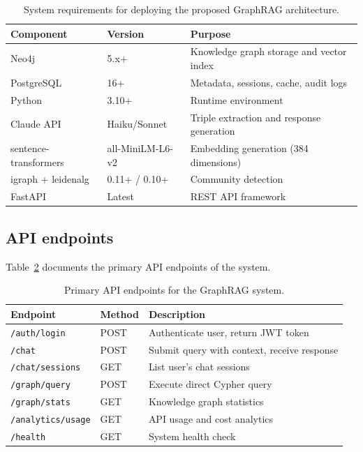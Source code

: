 \documentclass[review]{elsarticle}
\begin{document}
\begin{table}[ht]
\caption{System requirements for deploying the proposed GraphRAG architecture.}
\label{tab:requirements}
\centering
\small
\begin{tabular}{@{}llp{5cm}@{}}
\toprule
\textbf{Component} & \textbf{Version} & \textbf{Purpose} \\
\midrule
Neo4j & 5.x+ & Knowledge graph storage and vector index \\
PostgreSQL & 16+ & Metadata, sessions, cache, audit logs \\
Python & 3.10+ & Runtime environment \\
Claude API & Haiku/Sonnet & Triple extraction and response generation \\
sentence-transformers & all-MiniLM-L6-v2 & Embedding generation (384 dimensions) \\
igraph + leidenalg & 0.11+ / 0.10+ & Community detection \\
FastAPI & Latest & REST API framework \\
\bottomrule
\end{tabular}
\end{table}

\subsection{API endpoints}

Table~\ref{tab:api-endpoints} documents the primary API endpoints of the system.

\begin{table}[ht]
\caption{Primary API endpoints for the GraphRAG system.}
\label{tab:api-endpoints}
\centering
\small
\begin{tabular}{@{}llp{5cm}@{}}
\toprule
\textbf{Endpoint} & \textbf{Method} & \textbf{Description} \\
\midrule
\texttt{/auth/login} & POST & Authenticate user, return JWT token \\
\texttt{/chat} & POST & Submit query with context, receive response \\
\texttt{/chat/sessions} & GET & List user's chat sessions \\
\texttt{/graph/query} & POST & Execute direct Cypher query \\
\texttt{/graph/stats} & GET & Knowledge graph statistics \\
\texttt{/analytics/usage} & GET & API usage and cost analytics \\
\texttt{/health} & GET & System health check \\
\bottomrule
\end{tabular}
\end{table}
\end{document}
